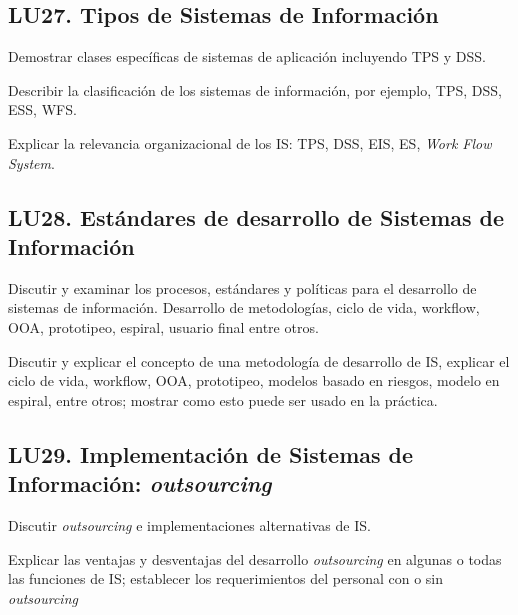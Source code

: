 \subsection{LU27. Tipos de Sistemas de Información}\label{sec:BOK-LU27}\label{sec:LU27}
\begin{LearningUnit}
\begin{LUGoal}
\item Demostrar clases específicas de sistemas de aplicación incluyendo TPS y DSS.
\end{LUGoal}

\begin{LUObjective}
\item Describir la clasificación de los sistemas de información, por  ejemplo, TPS, DSS, ESS, WFS.
\item Explicar la relevancia organizacional de los IS: TPS, DSS, EIS, ES, \textit{Work Flow System}.
\end{LUObjective}
\end{LearningUnit}

\subsection{LU28. Estándares de desarrollo de Sistemas de Información}\label{sec:BOK-LU28}\label{sec:LU28}
\begin{LearningUnit}
\begin{LUGoal}
\item Discutir  y examinar los procesos, estándares y políticas para el desarrollo de sistemas de información. Desarrollo de metodologías, ciclo de vida, workflow, OOA, prototipeo, espiral, usuario final entre otros.
\end{LUGoal}

\begin{LUObjective}
\item Discutir y explicar el concepto de una metodología de desarrollo de IS, explicar el ciclo de vida, workflow, OOA, prototipeo, modelos basado en riesgos, modelo en espiral, entre otros; mostrar como esto puede ser usado en la práctica.   
\end{LUObjective}
\end{LearningUnit}

\subsection{LU29. Implementación de Sistemas de Información: \textit{outsourcing}}\label{sec:BOK-LU29}\label{sec:LU29}
\begin{LearningUnit}
\begin{LUGoal}
\item Discutir \textit{outsourcing} e implementaciones alternativas de IS.
\end{LUGoal}

\begin{LUObjective}
\item Explicar las ventajas  y desventajas del desarrollo \textit{outsourcing} en algunas o todas las funciones de IS; establecer  los requerimientos del personal con o sin \textit{outsourcing}
\end{LUObjective}
\end{LearningUnit}

